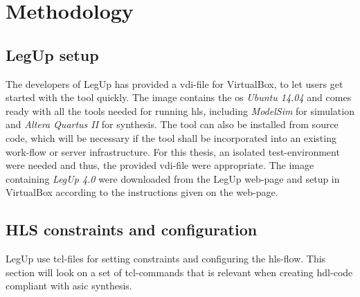\chapter{Methodology}
\label{chp:methodology} 

\section{LegUp setup}
The developers of LegUp has provided a \gls{vdi}-file for VirtualBox, to let users get started with the tool quickly. The image contains the \gls{os} \textit{Ubuntu 14.04} and comes ready with all the tools needed for running \gls{hls}, including \textit{ModelSim} for simulation and \textit{Altera Quartus II} for synthesis. The tool can also be installed from source code, which will be necessary if the tool shall be incorporated into an existing work-flow or server infrastructure.
For this thesis, an isolated test-environment were needed and thus, the provided \gls{vdi}-file were appropriate. The image containing \textit{LegUp 4.0} were downloaded from the LegUp web-page and setup in VirtualBox according to the instructions given on the web-page. 

\section{HLS constraints and configuration}
LegUp use \gls{tcl}-files for setting constraints and configuring the \gls{hls}-flow. This section will look on a set of \gls{tcl}-commands that is relevant when creating \gls{hdl}-code compliant with \gls{asic} synthesis.
